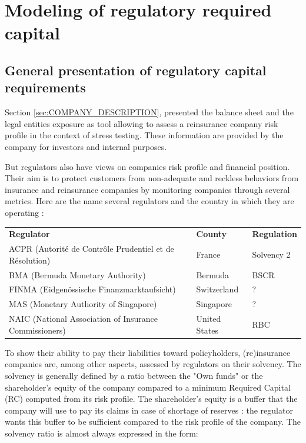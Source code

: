\section{Modeling of regulatory required capital}

\subsection{General presentation of regulatory capital requirements}

Section \ref{sec:COMPANY_DESCRIPTION}, presented the balance sheet and the legal entities exposure as tool allowing to assess a reinsurance company risk profile in the context of stress testing. These information are provided by the company for investors and internal purposes. 

But regulators also have views on companies risk profile and financial position. Their aim is to protect customers from non-adequate and reckless behaviors from insurance and reinsurance companies by monitoring companies through several metrics. Here are the name several regulators and the country in which they are operating :

\begin{center}
\begin{tabular}{ l l l }
\textbf{Regulator} & \textbf{County} & \textbf{Regulation} \\
ACPR (Autorité de Contrôle Prudentiel et de Résolution) & France & Solvency 2 \\ 
BMA (Bermuda Monetary Authority) & Bermuda & BSCR \\  
FINMA (Eidgenössische Finanzmarktaufsicht)& Switzerland & ? \\  
MAS (Monetary Authority of Singapore) & Singapore & ? \\
NAIC (National Association of Insurance Commissioners) & United States & RBC\\ 
\end{tabular}
\label{tab:REGULATION}
\end{center}

To show their ability to pay their liabilities toward policyholders, (re)insurance companies are, among other aspects, assessed by regulators on their solvency. The solvency is generally defined by a ratio between the "Own funds" or the shareholder's equity of the company compared to a minimum Required Capital (RC) computed from its risk profile. The shareholder's equity is a buffer that the company will use to pay its claims in case of shortage of reserves : the regulator wants this buffer to be sufficient compared to the risk profile of the company. The solvency ratio is almost always expressed in the form:

